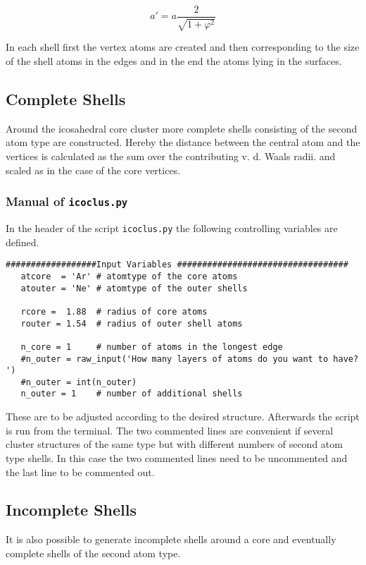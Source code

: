 \begin{equation}
 a' = a \frac{2}{\sqrt{1+\varphi^2}}
\end{equation}

In each shell first the vertex atoms are created and then corresponding
to the size of the shell atoms in the edges and in the end the atoms
lying in the surfaces.

\subsection{Complete Shells}
Around the icosahedral core cluster more complete shells consisting
of the second atom type are constructed. Hereby the distance between
the central atom and the vertices is calculated as the sum over the
contributing v. d. Waals radii. and scaled as in the case of the core
vertices.

\subsubsection{Manual of \lstinline|icoclus.py|}
In the header of the script \lstinline|icoclus.py| the following
controlling variables are defined.

\begin{lstlisting}
##################Input Variables ##################################
   atcore  = 'Ar' # atomtype of the core atoms
   atouter = 'Ne' # atomtype of the outer shells
   
   rcore =  1.88  # radius of core atoms
   router = 1.54  # radius of outer shell atoms
   
   n_core = 1     # number of atoms in the longest edge
   #n_outer = raw_input('How many layers of atoms do you want to have? ')
   #n_outer = int(n_outer)
   n_outer = 1    # number of additional shells
\end{lstlisting}

These are to be adjusted according to the desired structure.
Afterwards the script is run from the terminal.
The two commented lines are convenient if several cluster structures
of the same type but with different numbers of second atom type shells.
In this case the two commented lines need to be uncommented and the last
line to be commented out.

\subsection{Incomplete Shells}
It is also possible to generate incomplete shells around a core and
eventually complete shells of the second atom type.

